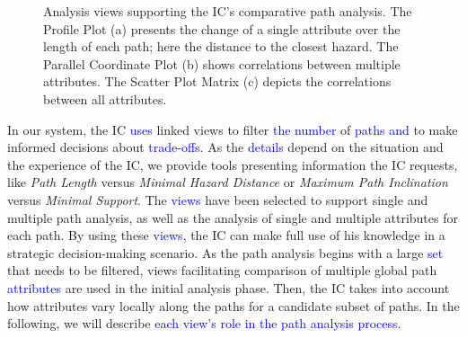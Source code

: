 \documentclass{egpubl}
\newcommand{\diff}[1]{\textcolor{blue}{#1}}
\begin{document}
\begin{figure}
{	    \label{fig:overview:analysis:pcp}
	}
	\hfill
	\caption{Analysis views supporting the IC's comparative path analysis. The Profile Plot (a) presents the change of a single attribute over the length of each path; here the distance to the closest hazard. The Parallel Coordinate Plot (b) shows correlations between multiple attributes. The Scatter Plot Matrix (c) depicts the correlations between all attributes.}
\end{figure}


In our system, the IC \diff{uses} linked views to filter \diff{the number} of \diff{paths} \diff{and} to make informed decisions about \diff{trade-offs}. As the \diff{details} depend on the situation and the experience of the IC, we provide tools presenting information the IC requests, like \emph{Path Length} versus \emph{Minimal Hazard Distance} or \emph{Maximum Path Inclination} versus \emph{Minimal Support}. The \diff{views} have been selected to support single and multiple path analysis, as well as the analysis of single and multiple attributes for each path. By using these \diff{views}, the IC can make full use of his knowledge in a strategic decision-making scenario. As the path analysis begins with a large \diff{set} that needs to be filtered, views facilitating comparison of multiple global path \diff{attributes} are used in the initial analysis phase. Then, the IC takes into account how attributes vary locally along the paths for a candidate subset of paths. In the following, we will describe \diff{each view's role in the path analysis process}.
\end{document}
